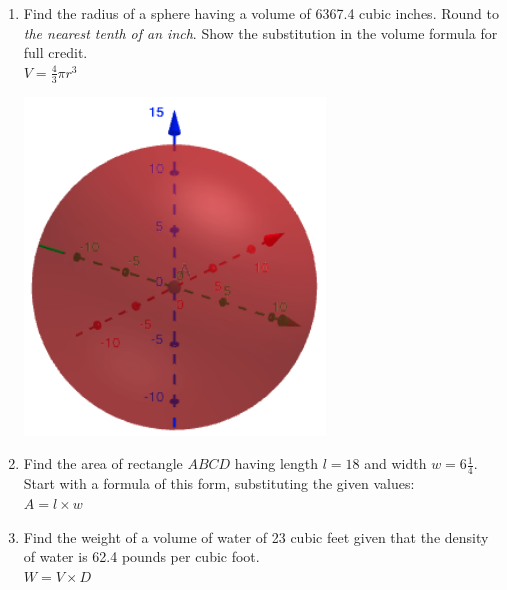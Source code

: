 \begin{enumerate}
\item Find the radius of a sphere having a volume of 6367.4 cubic inches. Round to \emph{the nearest tenth of an inch}. Show the substitution in the volume formula for full credit. \\[0.5cm]
$\displaystyle V = \frac{4}{3} \pi r^3$
  \begin{flushright}
    \includegraphics[width=8cm]{../graphics/04sphere.png}
  \end{flushright}

\item Find the area of rectangle $ABCD$ having length $l=18$ and width $w=6 \frac{1}{4}$. Start with a formula of this form, substituting the given values: \\[0.5cm]
$A = l \times w$
  \begin{flushright}
  \end{flushright}

\item Find the weight of a volume of water of 23 cubic feet given that the density of water is 62.4 pounds per cubic foot.  \\[0.5cm]
$W=V \times D$


\end{enumerate}
